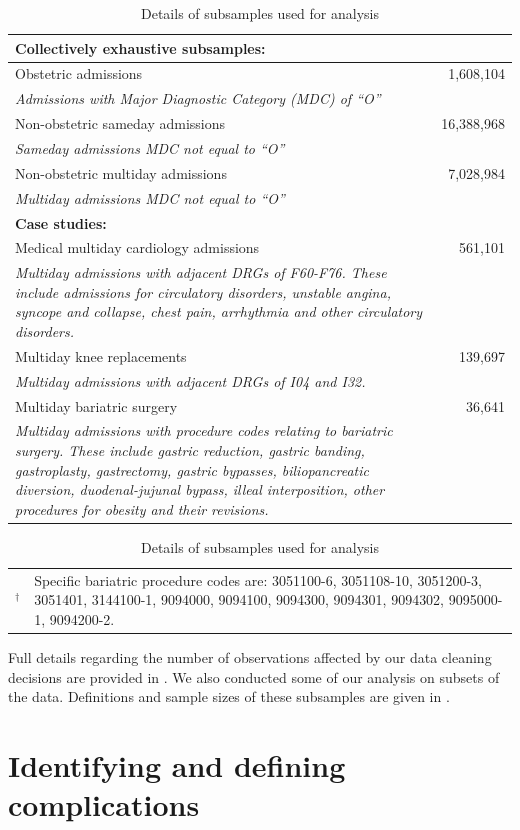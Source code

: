 \documentclass[submission]{grattan}
\begin{document}
\begin{table}
\caption{Details of subsamples used for analysis}\label{tbl:details-of-subsamples-used-for-analysis}
\begin{tabularx}{\linewidth}{Xr}
\toprule
\textbf{Collectively exhaustive subsamples:} &\tabularnewline
\midrule
Obstetric admissions & 1,608,104\tabularnewline
\textit{Admissions with Major Diagnostic Category (MDC) of ``O''} & \tabularnewline
Non-obstetric sameday admissions & 16,388,968\tabularnewline
\textit{Sameday admissions MDC not equal to ``O''} &\tabularnewline
Non-obstetric multiday admissions & 7,028,984\tabularnewline 
\textit{Multiday admissions MDC not equal to ``O''} &\tabularnewline
\textbf{Case studies:} &\tabularnewline
\midrule
Medical multiday cardiology admissions & 561,101\tabularnewline
\textit{Multiday admissions with adjacent DRGs of F60-F76.
These include admissions for circulatory disorders, unstable angina, syncope and collapse, chest pain, arrhythmia and other circulatory disorders.} &\tabularnewline
Multiday knee replacements & 139,697\tabularnewline
\textit{Multiday admissions with adjacent DRGs of I04 and I32.} &\tabularnewline
Multiday bariatric surgery & 36,641\tabularnewline
\textit{Multiday admissions with procedure codes relating to bariatric surgery.
These include gastric reduction, gastric banding, gastroplasty, gastrectomy, gastric bypasses, biliopancreatic diversion, duodenal-jujunal bypass, illeal interposition, other procedures for obesity and their revisions.} &\tabularnewline
\bottomrule
\end{tabularx}
\begin{tabularx}{\linewidth}{l@{}X}
{\footnotesize \({}^\dag\)} & {\footnotesize Specific bariatric procedure codes are: 3051100-6, 3051108-10, 3051200-3, 3051401, 3144100-1, 9094000, 9094100, 9094300, 9094301, 9094302, 9095000-1, 9094200-2.}
\end{tabularx}
\end{table}

Full details regarding the number of observations affected by our data cleaning decisions are provided in .
We also conducted some of our analysis on subsets of the data.
Definitions and sample sizes of these subsamples are given in .

\section{Identifying and defining complications}\label{sec:identifying-and-defining-complications}
\end{document}
